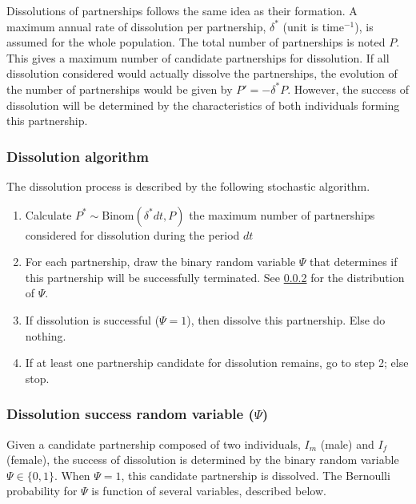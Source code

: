 \documentclass[11pt, onecolumn]{article}
\begin{document}
Dissolutions of partnerships follows the same idea as their formation. A maximum annual rate of dissolution per partnership, $\delta^*$ (unit is time$^{-1}$), is assumed for the whole population. The total number of partnerships is noted $P$. This gives a maximum number of candidate partnerships for dissolution. 
If all dissolution considered would actually dissolve the partnerships, the evolution of the number of partnerships would be given by $P'=-\delta^*P$.
However, the success of dissolution will be determined by the characteristics of both individuals forming this partnership.

\subsubsection{Dissolution algorithm}
The dissolution process is described by the following stochastic algorithm.

\begin{enumerate}
\item Calculate $P^* \sim \text{Binom}(\delta^*dt, P)$ the maximum number of partnerships considered for dissolution during the period $dt$

\item For each partnership, draw the binary random variable $\Psi$ that determines if this partnership will be successfully terminated. See \ref{dissolutionSuccessFormula} for the distribution of $\Psi$.

\item If dissolution is successful ($\Psi=1$), then dissolve this partnership. Else do nothing.

\item If at least one partnership candidate for dissolution remains, go to step 2; else stop.

\end{enumerate}

\subsubsection{Dissolution success random variable ($\Psi$)}
\label{dissolutionSuccessFormula}

Given a candidate partnership composed of two individuals, $I_m$ (male) and $I_f$ (female), the success of dissolution is determined by the binary random variable $\Psi\in\{0,1\}$. When $\Psi=1$, this candidate partnership is dissolved. The Bernoulli probability for $\Psi$ is function of several variables, described below.
\end{document}
